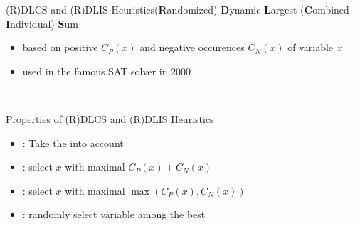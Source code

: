 \documentclass[t]{sdqbeamer}
\begin{document}
\begin{frame}{(R)DLCS and (R)DLIS Heuristics}{(\textbf{R}andomized) \textbf{D}ynamic \textbf{L}argest (\textbf{C}ombined | \textbf{I}ndividual) \textbf{S}um}
\begin{itemize}\setlength{\itemsep}{1ex}
	\item based on positive $C_P(x)$ and negative occurences $C_N(x)$ of variable $x$
	\item used in the famous SAT solver  in 2000
\end{itemize}~\\
\begin{blueblock}{Properties of (R)DLCS and (R)DLIS Heuristics}
\begin{itemize}\setlength{\itemsep}{1em}
	\item {}: Take the  into account
	\item {}: select $x$ with maximal $C_P(x)+C_N(x)$
	\item {}: select $x$ with maximal $\operatorname{max}(C_P(x),C_N(x))$
	\item {}: randomly select variable among the best
\end{itemize}
\end{blueblock}
\end{frame}
	

\end{document}
